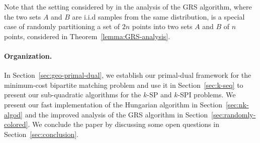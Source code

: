 Note that the setting considered by \citet{gattani2023robust} in the analysis of the GRS algorithm, where the two sets $A$ and $B$ are i.i.d samples from the same distribution, is a special case of randomly partitioning a set of $2n$ points into two sets $A$ and $B$ of $n$ points, considered in Theorem~\ref{lemma:GRS-analysis}.








\paragraph{Organization.} In Section~\ref{sec:geo-primal-dual}, we establish our primal-dual framework for the minimum-cost bipartite matching problem and use it in Section~\ref{sec:k-seq} to present our sub-quadratic algorithms for the $k$-SP and $k$-SPI problems. We present our fast implementation of the Hungarian algorithm in Section~\ref{sec:nk-algod} and the improved analysis of the GRS algorithm in Section~\ref{sec:randomly-colored}. We conclude the paper by discussing some open questions in Section~\ref{sec:conclusion}.
